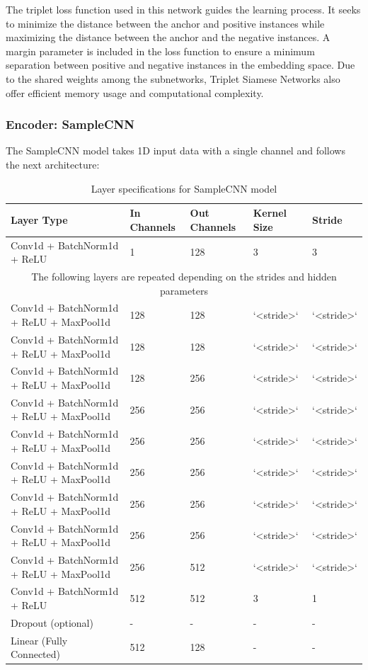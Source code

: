 The triplet loss function used in this network guides the learning process. It seeks to minimize the distance between the anchor and positive instances while maximizing the distance between the anchor and the negative instances. A margin parameter is included in the loss function to ensure a minimum separation between positive and negative instances in the embedding space. Due to the shared weights among the subnetworks, Triplet Siamese Networks also offer efficient memory usage and computational complexity.

\subsubsection{Encoder: SampleCNN}

The SampleCNN model \cite{Lee2018SampleCNN:Classification} takes 1D input data with a single channel and follows the next architecture:

\begin{table}[h]
\centering
\small
\begin{tabularx}{\textwidth}{|X|X|X|X|X|}
\hline
\textbf{Layer Type} & \textbf{In Channels} & \textbf{Out Channels} & \textbf{Kernel Size} & \textbf{Stride} \\
\hline
Conv1d + BatchNorm1d + ReLU & 1 & 128 & 3 & 3 \\
\hline
\multicolumn{5}{|c|}{The following layers are repeated depending on the strides and hidden parameters} \\
\hline
Conv1d + BatchNorm1d + ReLU + MaxPool1d & 128 & 128 & `<stride>` & `<stride>` \\
Conv1d + BatchNorm1d + ReLU + MaxPool1d & 128 & 128 & `<stride>` & `<stride>` \\
Conv1d + BatchNorm1d + ReLU + MaxPool1d & 128 & 256 & `<stride>` & `<stride>` \\
Conv1d + BatchNorm1d + ReLU + MaxPool1d & 256 & 256 & `<stride>` & `<stride>` \\
Conv1d + BatchNorm1d + ReLU + MaxPool1d & 256 & 256 & `<stride>` & `<stride>` \\
Conv1d + BatchNorm1d + ReLU + MaxPool1d & 256 & 256 & `<stride>` & `<stride>` \\
Conv1d + BatchNorm1d + ReLU + MaxPool1d & 256 & 256 & `<stride>` & `<stride>` \\
Conv1d + BatchNorm1d + ReLU + MaxPool1d & 256 & 256 & `<stride>` & `<stride>` \\
Conv1d + BatchNorm1d + ReLU + MaxPool1d & 256 & 512 & `<stride>` & `<stride>` \\
\hline
Conv1d + BatchNorm1d + ReLU & 512 & 512 & 3 & 1 \\
\hline
Dropout (optional) & - & - & - & - \\
\hline
Linear (Fully Connected) & 512 & 128 & - & - \\
\hline
\end{tabularx}
\caption{Layer specifications for SampleCNN model}
\label{tab:samplecnn}
\end{table}



